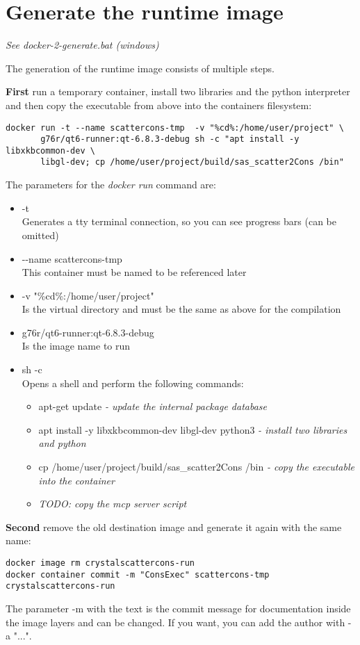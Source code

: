 \documentclass[11pt]{article} %
\begin{document}
\section{Generate the runtime image}

\centerline{\it See docker-2-generate.bat (windows)}

The generation of the runtime image consists of multiple steps.

{\bf First} run a temporary container, install two libraries and the python interpreter and then copy the executable from above into the containers filesystem:
\begin{lstlisting}[frame=single]
docker run -t --name scattercons-tmp  -v "%cd%:/home/user/project" \
       g76r/qt6-runner:qt-6.8.3-debug sh -c "apt install -y libxkbcommon-dev \
       libgl-dev; cp /home/user/project/build/sas_scatter2Cons /bin"
\end{lstlisting}
The parameters for the {\it docker run} command are:
\begin{itemize}\itemsep0pt
\item -t \\
	Generates a tty terminal connection, so you can see progress bars (can be omitted)
\item -{}-name scattercons-tmp \\
	This container must be named to be referenced later
\item -v "\%cd\%:/home/user/project" \\
	Is the virtual directory and must be the same as above for the compilation
\item g76r/qt6-runner:qt-6.8.3-debug \\
	Is the image name to run
\item sh -c \\
	Opens a shell and perform the following commands:
	\begin{itemize}[*]\itemsep0pt
	\item apt-get update {\it - update the internal package database}
	\item apt install -y libxkbcommon-dev libgl-dev python3 {\it - install two libraries and python}
	\item cp /home/user/project/build/sas\_scatter2Cons /bin {\it - copy the executable into the container}
	\item {\it TODO: copy the mcp server script}
	\end{itemize}
\end{itemize}

{\bf Second} remove the old destination image and generate it again with the same name:
\begin{lstlisting}[frame=single]
docker image rm crystalscattercons-run
docker container commit -m "ConsExec" scattercons-tmp crystalscattercons-run
\end{lstlisting}
The parameter -m with the text is the commit message for documentation inside the image layers and can be changed. If you want, you can add the author with -a "...".
\end{document}

